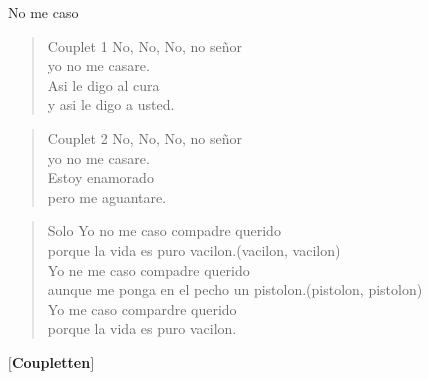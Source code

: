 \begin{song}{No me caso}
\begin{verse}{Couplet 1}
No, No, No, no se\~nor\\
yo no me casare.\\
Asi le digo al cura\\
y asi le digo a usted.\\
\end{verse}
\begin{verse}{Couplet 2}
No, No, No, no se\~nor\\
yo no me casare.\\
Estoy enamorado\\
pero me aguantare.\\
\end{verse}

\begin{verse}{Solo}
 Yo no me caso compadre querido\\
porque la vida es puro vacilon.\hspace{8em}(vacilon, vacilon)\\
\chord{\hspace{1pt}}Yo ne me caso compadre querido\\
aunque me ponga en el pecho un pistolon.\hspace{3em}(pistolon, pistolon)\\
\chord{\hspace{1pt}}Yo me caso compardre querido\\
porque la vida es puro vacilon.\\
\end{verse}

\textbf{$[$Coupletten$]$}\\
\end{song}
